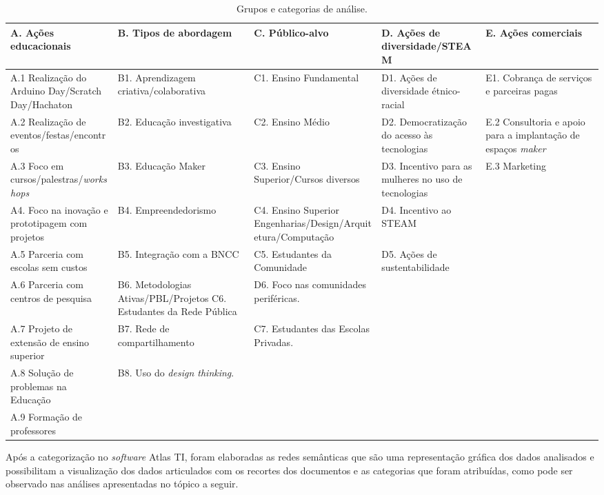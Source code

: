 \documentclass[portuguese]{textolivre}
\begin{document}
\begin{table}[h!]
\centering
\begin{footnotesize}
\caption{Grupos e categorias de análise.}
\label{tbl1}
\footnotesize
\begin{tabular}{>{\raggedright\arraybackslash}p{2.5cm} >{\raggedright\arraybackslash}p{2.5cm} >{\raggedright\arraybackslash}p{2.5cm} >{\raggedright\arraybackslash}p{2.5cm} >{\raggedright\arraybackslash}p{2.5cm}}
\toprule
A. Ações educacionais & B. Tipos de abordagem & C. Público-alvo & D. Ações de diversidade/STEAM & E. Ações comerciais \\ 
\midrule
A.1 Realização do Arduino Day/Scratch Day/Hachaton & B1. Aprendizagem criativa/cola\-bo\-ra\-ti\-va & C1. Ensino Fundamental & D1. Ações de diversidade étnico-racial & E1. Cobrança de serviços e parceiras pagas \\
A.2 Realização de eventos/festas/en\-con\-tros & B2. Educação investigativa &
C2. Ensino Médio & D2. Democratização do acesso às tecnologias & E.2 Consultoria e apoio para a implantação de espaços \textit{maker} \\
A.3 Foco em cursos/pa\-les\-tras/\textit{work\-shops} & B3. Educação Maker & C3. Ensino Superior/Cursos diversos & D3. Incentivo para as mulheres no uso de tecnologias & E.3 Marketing \\
A4. Foco na inovação e prototipagem com projetos & B4. Empreendedorismo & 
C4. Ensino Superior En\-ge\-nha\-rias/Design/Ar\-qui\-te\-tu\-ra/Com\-pu\-ta\-ção & D4. Incentivo ao STEAM & \\
A.5 Parceria com escolas sem custos & B5. Integração com a BNCC & C5. Estudantes da Comunidade & D5. Ações de sustentabilidade & \\
A.6 Parceria com centros de pesquisa & B6. Metodologias Ativas/PBL/Pro\-je\-tos
C6. Estudantes da Rede Pública & D6. Foco nas comunidades periféricas. & \\
A.7 Projeto de extensão de ensino superior & B7. Rede de compartilhamento & 
C7. Estudantes das Escolas Privadas. & & \\
A.8 Solução de problemas na Educação & B8. Uso do \textit{design thinking}. & & & \\
A.9 Formação de professores & & & & \\
\bottomrule
\end{tabular}
\end{footnotesize}
\end{table}

Após a categorização no \textit{software} Atlas TI, foram elaboradas as redes semânticas que são uma representação gráfica dos dados analisados e possibilitam a visualização dos dados articulados com os recortes dos documentos e as categorias que foram atribuídas, como pode ser observado nas análises apresentadas no tópico a seguir.
\end{document}
